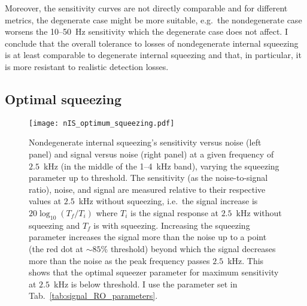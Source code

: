 Moreover, the sensitivity curves are not directly comparable and for different metrics, the degenerate case might be more suitable, e.g.\ the nondegenerate case worsens the 10--50~Hz sensitivity which the degenerate case does not affect. %
I conclude that the overall tolerance to losses of nondegenerate internal squeezing is at least comparable to degenerate internal squeezing and that, in particular, it is more resistant to realistic detection losses.


\subsection{Optimal squeezing}
\label{sec:nIS_optimal_squeezing}

\begin{figure}[ht]
	\centering
	\texttt{[image: nIS\_optimum\_squeezing.pdf]}
	\caption{ Nondegenerate internal squeezing's sensitivity versus noise (left panel) and signal versus noise (right panel) at a given frequency of $2.5$~kHz (in the middle of the 1--4~kHz band), varying the squeezing parameter up to threshold. The sensitivity (as the noise-to-signal ratio), noise, and signal are measured relative to their respective values at $2.5$~kHz without squeezing, i.e.\ the signal increase is $20\log_{10}(T_f/T_i)$ where $T_i$ is the signal response at $2.5$~kHz without squeezing and $T_f$ is with squeezing. Increasing the squeezing parameter increases the signal more than the noise up to a point (the red dot at $\sim85\%$ threshold) beyond which the signal decreases more than the noise as the peak frequency passes $2.5$~kHz. This shows that the optimal squeezer parameter for maximum sensitivity at $2.5$~kHz is below threshold. I use the parameter set in Tab.~\ref{tab:signal_RO_parameters}.
    }
	\label{fig:nIS_optimum_squeezing}
\end{figure}

